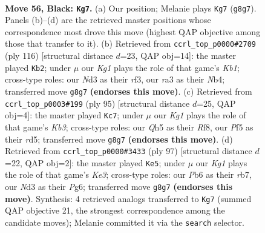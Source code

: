 \documentclass[11pt]{article}
\begin{document}
\clearpage

\begin{figure}[p]\centering
\begin{subfigure}{0.46\textwidth}\centering
\resizebox{\linewidth}{!}{%
\newchessgame
\chessboard[
  setfen={6k1/p7/1p6/5p1q/P1p5/R2n2P1/1P4K1/8 b - - 3 56},
  showmover=false,
  pgfstyle=straightmove, color=movearrow, markmove={g8-g7}
]}
\caption{}
\end{subfigure}\hfill
\begin{subfigure}{0.46\textwidth}\centering
\resizebox{\linewidth}{!}{%
\newchessgame
\chessboard[
  setfen={8/bPB2k2/5p2/3p2p1/1N4P1/2P2r2/8/1K6 w - - 9 59},
  showmover=false,
  pgfstyle=straightmove, color=movearrow, markmove={b1-b2}
]}
\caption{}
\end{subfigure}
\\[4pt]
\begin{subfigure}{0.46\textwidth}\centering
\resizebox{\linewidth}{!}{%
\newchessgame
\chessboard[
  setfen={5r2/8/pk5p/P2Rn1p1/4P1P1/4K3/8/8 b - - 0 48},
  showmover=false,
  pgfstyle=straightmove, color=movearrow, markmove={b6-c7}
]}
\caption{}
\end{subfigure}\hfill
\begin{subfigure}{0.46\textwidth}\centering
\resizebox{\linewidth}{!}{%
\newchessgame
\chessboard[
  setfen={8/1R5p/p3k1p1/5p2/8/1P3KPP/P7/2r5 b - - 0 49},
  showmover=false,
  pgfstyle=straightmove, color=movearrow, markmove={e6-e5}
]}
\caption{}
\end{subfigure}
\caption{\textbf{Move 56, Black: \texttt{Kg7}.} (a) Our position; Melanie plays \texttt{Kg7} (\texttt{g8g7}). Panels (b)--(d) are the retrieved master positions whose correspondence most drove this move (highest QAP objective among those that transfer to it). (b) Retrieved from \texttt{ccrl\_top\_p0000\#2709} (ply 116) [structural distance $d$=23, QAP obj=14]: the master played \texttt{Kb2}; under $\mu$ our \emph{Kg1} plays the role of that game's \emph{Kb1}; cross-type roles: our \emph{N}d3 as their \emph{r}f3, our \emph{r}a3 as their \emph{N}b4; transferred move \texttt{g8g7} \textbf{(endorses this move)}. (c) Retrieved from \texttt{ccrl\_top\_p0003\#199} (ply 95) [structural distance $d$=25, QAP obj=4]: the master played \texttt{Kc7}; under $\mu$ our \emph{Kg1} plays the role of that game's \emph{Kb3}; cross-type roles: our \emph{Q}h5 as their \emph{R}f8, our \emph{P}f5 as their \emph{r}d5; transferred move \texttt{g8g7} \textbf{(endorses this move)}. (d) Retrieved from \texttt{ccrl\_top\_p0000\#3433} (ply 97) [structural distance $d$=22, QAP obj=2]: the master played \texttt{Ke5}; under $\mu$ our \emph{Kg1} plays the role of that game's \emph{Ke3}; cross-type roles: our \emph{P}b6 as their \emph{r}b7, our \emph{N}d3 as their \emph{P}g6; transferred move \texttt{g8g7} \textbf{(endorses this move)}. Synthesis: 4 retrieved analogs transferred to \texttt{Kg7} (summed QAP objective 21, the strongest correspondence among the candidate moves); Melanie committed it via the \texttt{search} selector.}
\label{fig:thought-m111}
\end{figure}
\end{document}
